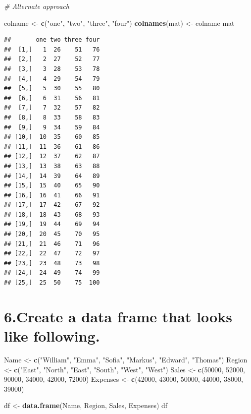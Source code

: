 \documentclass[]{article}
\newenvironment{Shaded}{\begin{snugshade}}{\end{snugshade}}
\newcommand{\CommentTok}[1]{\textcolor[rgb]{0.56,0.35,0.01}{\textit{#1}}}
\newcommand{\DecValTok}[1]{\textcolor[rgb]{0.00,0.00,0.81}{#1}}
\newcommand{\KeywordTok}[1]{\textcolor[rgb]{0.13,0.29,0.53}{\textbf{#1}}}
\newcommand{\NormalTok}[1]{#1}
\newcommand{\StringTok}[1]{\textcolor[rgb]{0.31,0.60,0.02}{#1}}
\begin{document}
\begin{Shaded}
\begin{Highlighting}[]
\CommentTok{# Alternate approach}

\NormalTok{colname <-}\StringTok{ }\KeywordTok{c}\NormalTok{(}\StringTok{"one"}\NormalTok{, }\StringTok{"two"}\NormalTok{, }\StringTok{"three"}\NormalTok{, }\StringTok{"four"}\NormalTok{)}
\KeywordTok{colnames}\NormalTok{(mat) <-}\StringTok{ }\NormalTok{colname}
\NormalTok{mat}
\end{Highlighting}
\end{Shaded}

\begin{verbatim}
##       one two three four
##  [1,]   1  26    51   76
##  [2,]   2  27    52   77
##  [3,]   3  28    53   78
##  [4,]   4  29    54   79
##  [5,]   5  30    55   80
##  [6,]   6  31    56   81
##  [7,]   7  32    57   82
##  [8,]   8  33    58   83
##  [9,]   9  34    59   84
## [10,]  10  35    60   85
## [11,]  11  36    61   86
## [12,]  12  37    62   87
## [13,]  13  38    63   88
## [14,]  14  39    64   89
## [15,]  15  40    65   90
## [16,]  16  41    66   91
## [17,]  17  42    67   92
## [18,]  18  43    68   93
## [19,]  19  44    69   94
## [20,]  20  45    70   95
## [21,]  21  46    71   96
## [22,]  22  47    72   97
## [23,]  23  48    73   98
## [24,]  24  49    74   99
## [25,]  25  50    75  100
\end{verbatim}

\hypertarget{create-a-data-frame-that-looks-like-following.}{%
\section{6.Create a data frame that looks like
following.}\label{create-a-data-frame-that-looks-like-following.}}

\begin{Shaded}
\begin{Highlighting}[]
\NormalTok{Name <-}\StringTok{ }\KeywordTok{c}\NormalTok{(}\StringTok{"William"}\NormalTok{, }\StringTok{"Emma"}\NormalTok{, }\StringTok{"Sofia"}\NormalTok{, }\StringTok{"Markus"}\NormalTok{, }\StringTok{"Edward"}\NormalTok{, }\StringTok{"Thomas"}\NormalTok{)}
\NormalTok{Region <-}\StringTok{ }\KeywordTok{c}\NormalTok{(}\StringTok{"East"}\NormalTok{, }\StringTok{"North"}\NormalTok{, }\StringTok{"East"}\NormalTok{, }\StringTok{"South"}\NormalTok{, }\StringTok{"West"}\NormalTok{, }\StringTok{"West"}\NormalTok{)}
\NormalTok{Sales <-}\StringTok{ }\KeywordTok{c}\NormalTok{(}\DecValTok{50000}\NormalTok{, }\DecValTok{52000}\NormalTok{, }\DecValTok{90000}\NormalTok{, }\DecValTok{34000}\NormalTok{, }\DecValTok{42000}\NormalTok{, }\DecValTok{72000}\NormalTok{)}
\NormalTok{Expenses <-}\StringTok{ }\KeywordTok{c}\NormalTok{(}\DecValTok{42000}\NormalTok{, }\DecValTok{43000}\NormalTok{, }\DecValTok{50000}\NormalTok{, }\DecValTok{44000}\NormalTok{, }\DecValTok{38000}\NormalTok{, }\DecValTok{39000}\NormalTok{)}

\NormalTok{df <-}\StringTok{ }\KeywordTok{data.frame}\NormalTok{(Name, Region, Sales, Expenses)}
\NormalTok{df}
\end{Highlighting}
\end{Shaded}
\end{document}

